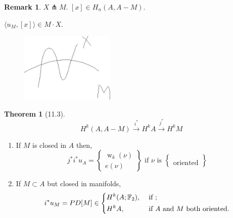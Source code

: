 \documentclass{article}
\theoremstyle{definition}
\newtheorem{theorem}{Theorem}
\newtheorem*{remark}{Remark}
\begin{document}
    \begin{remark}
        \(X\pitchfork M\). \([x] \in H_n(A,A-M)\).
        
        \(\langle u_M , [x] \rangle \in M \cdot X\).

        \begin{figure}[H]
            \centering
            \includegraphics[width=0.4\textwidth]{img/imgthmclss}
        \end{figure}
    \end{remark}

    \begin{theorem}
        [11.3] 
        \[
            H^k(A, A-M) \xrightarrow{i^{\ast}} H^k A \xrightarrow{j^{\ast}} H^k M
        \]

        \begin{enumerate}[label=\alph*)]
            \item If \(M\) is closed in \(A\) then,
            \[
                j^{\ast} i^{\ast} u_A = \begin{Bmatrix} \operatorname{w}_k(\nu) \\ e(\nu) \end{Bmatrix} \text{ if } \nu\text{ is } \begin{Bmatrix} \\ \text{oriented} \end{Bmatrix} 
            \]

            \item If \(M \subset A\) but closed in manifolds,
            \[
                i^{\ast} u_M = PD[M] \in \begin{dcases}
                    H^k(A;\mathbb{F}_2), &\text{ if }  ;\\
                    H^k A, &\text{ if } A \text{ and } M \text{ both oriented}.
                \end{dcases}
            \]
        \end{enumerate} 
    \end{theorem}
\end{document}
